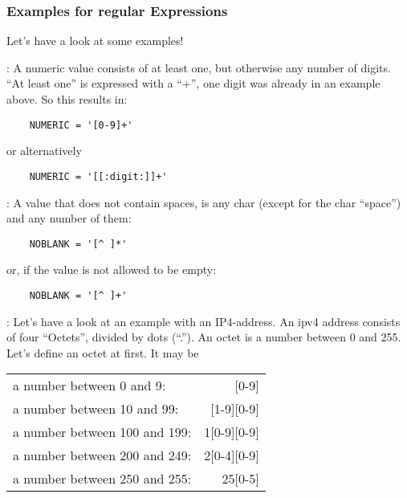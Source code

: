 \subsubsection{Examples for regular Expressions}

Let's have a look at some examples!

: A numeric value consists of at least one, but otherwise
any number of digits. ``At least one'' is expressed with a ``+'', one digit
was already in an example above. So this results in:

\begin{example}
\begin{verbatim}
    NUMERIC = '[0-9]+'
\end{verbatim}
\end{example}
or alternatively
\begin{example}
\begin{verbatim}
    NUMERIC = '[[:digit:]]+'
\end{verbatim}
\end{example}

: A value that does not contain spaces, is any
char (except for the char ``space'') and any number of them:

\begin{example}
\begin{verbatim}
    NOBLANK = '[^ ]*'
\end{verbatim}
\end{example}

or, if the value is not allowed to be empty:

\begin{example}
\begin{verbatim}
    NOBLANK = '[^ ]+'
\end{verbatim}
\end{example}

: Let's have a look at an example with an IP4-address. An
ipv4 address consists of four ``Octets'', divided by dots (``.''). An
octet is a number between 0 and 255. Let's define an octet at first.
It may be\\

\begin{tabular}[ht!]{lr}
  a number between 0 and 9: &       [0-9]\\
  a number between 10 and 99: &     [1-9][0-9]\\
  a number between 100 and 199:&   1[0-9][0-9]\\
  a number between 200 and 249: &  2[0-4][0-9]\\
  a number between 250 and 255: & 25[0-5]\\
\end{tabular}\\

